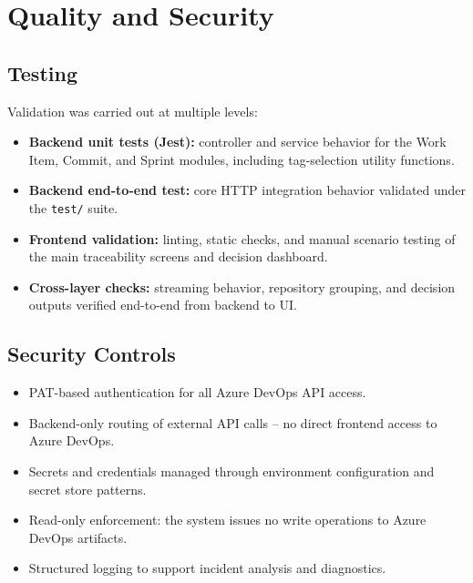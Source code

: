 \section{Quality and Security}

\subsection{Testing}

Validation was carried out at multiple levels:

\begin{itemize}
  \item \textbf{Backend unit tests (Jest):} controller and service behavior for
  the Work Item, Commit, and Sprint modules, including tag-selection utility
  functions.
  \item \textbf{Backend end-to-end test:} core HTTP integration behavior
  validated under the \texttt{test/} suite.
  \item \textbf{Frontend validation:} linting, static checks, and manual
  scenario testing of the main traceability screens and decision dashboard.
  \item \textbf{Cross-layer checks:} streaming behavior, repository grouping,
  and decision outputs verified end-to-end from backend to UI.
\end{itemize}

\subsection{Security Controls}

\begin{itemize}
  \item PAT-based authentication for all Azure DevOps API access.
  \item Backend-only routing of external API calls -- no direct frontend access
  to Azure DevOps.
  \item Secrets and credentials managed through environment configuration and
  secret store patterns.
  \item Read-only enforcement: the system issues no write operations to Azure
  DevOps artifacts.
  \item Structured logging to support incident analysis and diagnostics.
\end{itemize}

